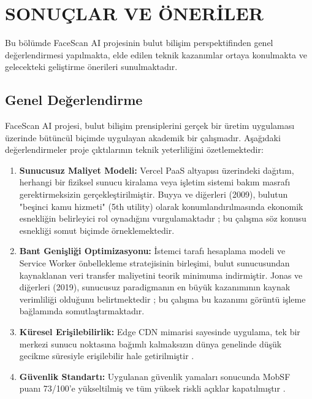 \section{SONUÇLAR VE ÖNERİLER}

Bu bölümde FaceScan AI projesinin bulut bilişim perspektifinden genel değerlendirmesi yapılmakta, elde edilen teknik kazanımlar ortaya konulmakta ve gelecekteki geliştirme önerileri sunulmaktadır.

\subsection{Genel Değerlendirme}

FaceScan AI projesi, bulut bilişim prensiplerini gerçek bir üretim uygulaması üzerinde bütüncül biçimde uygulayan akademik bir çalışmadır. Aşağıdaki değerlendirmeler proje çıktılarının teknik yeterliliğini özetlemektedir:

\begin{enumerate}
  \item \textbf{Sunucusuz Maliyet Modeli:} Vercel PaaS altyapısı üzerindeki dağıtım, herhangi bir fiziksel sunucu kiralama veya işletim sistemi bakım masrafı gerektirmeksizin gerçekleştirilmiştir. Buyya ve diğerleri (2009), bulutun "beşinci kamu hizmeti" (5th utility) olarak konumlandırılmasında ekonomik esnekliğin belirleyici rol oynadığını vurgulamaktadır \cite{buyya2009cloud}; bu çalışma söz konusu esnekliği somut biçimde örneklemektedir.

  \item \textbf{Bant Genişliği Optimizasyonu:} İstemci tarafı hesaplama modeli ve Service Worker önbellekleme stratejisinin birleşimi, bulut sunucusundan kaynaklanan veri transfer maliyetini teorik minimuma indirmiştir. Jonas ve diğerleri (2019), sunucusuz paradigmanın en büyük kazanımının kaynak verimliliği olduğunu belirtmektedir \cite{jonas2019cloud}; bu çalışma bu kazanımı görüntü işleme bağlamında somutlaştırmaktadır.

  \item \textbf{Küresel Erişilebilirlik:} Edge CDN mimarisi sayesinde uygulama, tek bir merkezi sunucu noktasına bağımlı kalmaksızın dünya genelinde düşük gecikme süresiyle erişilebilir hale getirilmiştir \cite{panda2018cdn}.

  \item \textbf{Güvenlik Standartı:} Uygulanan güvenlik yamaları sonucunda MobSF puanı 73/100'e yükseltilmiş ve tüm yüksek riskli açıklar kapatılmıştır \cite{mobsf2023docs, owasp2023mobile}.
\end{enumerate}

